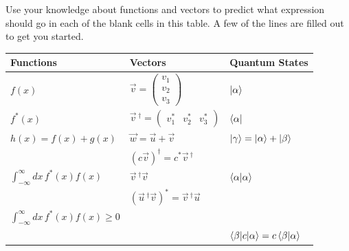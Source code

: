 	\begin{questions}
	
		\question Use your knowledge about functions and vectors to predict what expression should go in each of the blank cells in this table. A few of the lines are filled out to get you started.
		
			\begin{center}
				\renewcommand{\arraystretch}{1.5}
			\begin{tabular}{|C{2in}| C{2in} | C{2in}|}
				\hline
				
				\textbf{Functions} 
				& \textbf{Vectors}  
				& \textbf{Quantum States}
				\\
				\hline
				
				$f(x)$
				& $\vec v = \begin{pmatrix} v_1 \\ v_2 \\ v_3\end{pmatrix}$
				& $\ket{\alpha}$
				\\
				\hline
				
				$f^*(x)$
				& $\vec v\,^\dag = \begin{pmatrix} v_1^* & v_2^* & v_3^*\end{pmatrix}$
				& $\bra{\alpha}$
				\\
				\hline
				
				$h(x) = f(x) + g(x)$
				& $\vec w = \vec u + \vec v$
				& $\ket\gamma = \ket \alpha + \ket \beta$
				\\
				\hline
				
				& $\left( c\vec v \right)^\dag = c^* \vec v\,^\dag$
				& \vspace{0.75in}
				\\
				\hline
				
				$\int_{-\infty}^\infty dx\, f^*(x) f(x)$
				& $\vec v\,^\dag \vec v$
				& $\braket{\alpha|\alpha}$
				\\
				\hline
				
				&$\left(\vec u\,^\dag \vec v\right)^* = \vec v\,^\dag \vec u$
				& \vspace{0.75 in}
				\\
				\hline
				
				$\int_{-\infty}^\infty dx\, f^*(x) f(x) \geq 0$
				&
				& \vspace{0.75 in}
				\\
				\hline
				
				& \vspace{0.75 in}
				&
				$\braket{\beta|c|\alpha} = c \braket{\beta|\alpha}$
				\\
				\hline
				

\end{tabular}
\end{center}
\end{questions}
